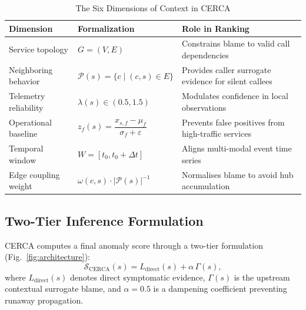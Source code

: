 \documentclass[conference]{IEEEtran}
\begin{document}
\begin{table}[!t]
\renewcommand{\arraystretch}{1.3}
\caption{The Six Dimensions of Context in CERCA}
\label{tab:context}
\centering
\footnotesize
\setlength{\tabcolsep}{3pt}
\begin{tabular}{L{0.85in}C{1.15in}L{1.2in}}
\toprule
Dimension & Formalization & Role in Ranking \\
\midrule
Service topology & $G=(V,E)$ & Constrains blame to valid call dependencies \\
Neighboring behavior & $\mathcal{P}(s)=\{c\mid(c,s)\in E\}$ & Provides caller surrogate evidence for silent callees \\
Telemetry reliability & $\lambda(s)\in(0.5,1.5)$ & Modulates confidence in local observations \\
Operational baseline & $z_f(s)=\dfrac{x_{s,f}-\mu_f}{\sigma_f+\varepsilon}$ & Prevents false positives from high-traffic services \\
Temporal window & $W=[t_0,t_0+\Delta t]$ & Aligns multi-modal event time series \\
Edge coupling weight & $\omega(c,s)\cdot|\mathcal{P}(s)|^{-1}$ & Normalises blame to avoid hub accumulation \\
\bottomrule
\end{tabular}
\end{table}

\subsection{Two-Tier Inference Formulation}
CERCA computes a final anomaly score through a two-tier formulation (Fig.~\ref{fig:architecture}):
\begin{equation}
\mathcal{S}_{\mathrm{CERCA}}(s)=L_{\mathrm{direct}}(s)+\alpha\,\Gamma(s),
\label{eq:cerca_main}
\end{equation}
where $L_{\mathrm{direct}}(s)$ denotes direct symptomatic evidence, $\Gamma(s)$ is the upstream contextual surrogate blame, and $\alpha=0.5$ is a dampening coefficient preventing runaway propagation.
\end{document}
